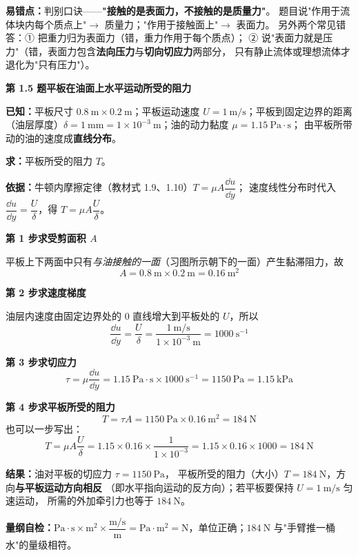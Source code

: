 \begin{yicuo}
\textbf{易错点：}判别口诀——\textbf{"接触的是表面力，不接触的是质量力"}。
题目说"作用于流体块内每个质点上"$\to$ 质量力；"作用于接触面上"$\to$ 表面力。
另外两个常见错答：① 把重力归为表面力（错，重力作用于每个质点）；
② 说"表面力就是压力"（错，表面力包含\textbf{法向压力}与\textbf{切向切应力}两部分，
只有静止流体或理想流体才退化为"只有压力"）。
\end{yicuo}

\noindent\textbf{第 1.5 题\quad 平板在油面上水平运动所受的阻力}

\begin{jie}
\textbf{已知：}平板尺寸 $0.8\ \mathrm{m}\times0.2\ \mathrm{m}$；平板运动速度
$U=1\ \mathrm{m/s}$；平板到固定边界的距离（油层厚度）$\delta=1\ \mathrm{mm}
=1\times10^{-3}\ \mathrm{m}$；油的动力黏度 $\mu=1.15\ \mathrm{Pa\cdot s}$；
由平板所带动的油的速度成\textbf{直线分布}。

\textbf{求：}平板所受的阻力 $T$。

\textbf{依据：}牛顿内摩擦定律（教材式 1.9、1.10）$T=\mu A\dfrac{\dd u}{\dd y}$；
速度线性分布时代入 $\dfrac{\dd u}{\dd y}=\dfrac{U}{\delta}$，得 $T=\mu A\dfrac{U}{\delta}$。

\textbf{第 1 步\quad 求受剪面积 $A$}

平板上下两面中只有\emph{与油接触的一面}（习图所示朝下的一面）产生黏滞阻力，故
\[ A=0.8\ \mathrm{m}\times0.2\ \mathrm{m}=0.16\ \mathrm{m^2} \]

\textbf{第 2 步\quad 求速度梯度}

油层内速度由固定边界处的 $0$ 直线增大到平板处的 $U$，所以
\[ \frac{\dd u}{\dd y}=\frac{U}{\delta}=\frac{1\ \mathrm{m/s}}{1\times10^{-3}\ \mathrm{m}}
   =1000\ \mathrm{s^{-1}} \]

\textbf{第 3 步\quad 求切应力}
\[ \tau=\mu\frac{\dd u}{\dd y}=1.15\ \mathrm{Pa\cdot s}\times1000\ \mathrm{s^{-1}}
   =1150\ \mathrm{Pa}=1.15\ \mathrm{kPa} \]

\textbf{第 4 步\quad 求平板所受的阻力}
\[ T=\tau A=1150\ \mathrm{Pa}\times0.16\ \mathrm{m^2}=184\ \mathrm{N} \]
也可以一步写出：
\[ T=\mu A\frac{U}{\delta}=1.15\times0.16\times\frac{1}{1\times10^{-3}}
   =1.15\times0.16\times1000=184\ \mathrm{N} \]

\textbf{结果：}油对平板的切应力 $\tau=1150\ \mathrm{Pa}$，
平板所受的阻力（大小）$T=184\ \mathrm{N}$，方向\textbf{与平板运动方向相反}
（即水平指向运动的反方向）；若平板要保持 $U=1\ \mathrm{m/s}$ 匀速运动，
所需的外加牵引力也等于 $184\ \mathrm{N}$。

\textbf{量纲自检：}$\mathrm{Pa\cdot s\times m^2\times\dfrac{m/s}{m}}
=\mathrm{Pa\cdot m^2}=\mathrm{N}$，单位正确；$184\ \mathrm{N}$ 与"手臂推一桶水"的量级相符。
\end{jie}

